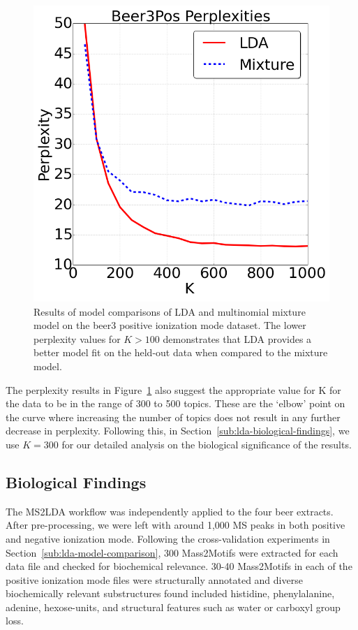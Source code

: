 \begin{figure}[!htbp]
\centering\includegraphics[width=0.5\linewidth]{07-lda/figures/perplexity.png}
\centering\caption{Results of model comparisons of LDA and multinomial mixture model on the beer3 positive ionization mode dataset. The lower perplexity values for $K>100$ demonstrates that LDA provides a better model fit on the held-out data when compared to the mixture model.\label{fig:m2lda-perplexity}}
\end{figure}

The perplexity results in Figure~\ref{fig:m2lda-perplexity} also suggest the appropriate value for K for the data to be in the range of 300 to 500 topics. These are the `elbow' point on the curve where increasing the number of topics does not result in any further decrease in perplexity. Following this, in Section~\ref{sub:lda-biological-findings}, we use $K=300$ for our detailed analysis on the biological significance of the results.

\subsection{Biological Findings\label{sub:lda-biological-findings}}

The MS2LDA workflow was independently applied to the four beer extracts. After pre-processing, we were left with around 1,000 MS peaks in both positive and negative ionization mode. Following the cross-validation experiments in Section~\ref{sub:lda-model-comparison}, 300 Mass2Motifs were extracted for each data file and checked for biochemical relevance. 30-40 Mass2Motifs in each of the positive ionization mode files were structurally annotated and diverse biochemically relevant substructures found included histidine, phenylalanine, adenine, hexose-units, and structural features such as water or carboxyl group loss.

